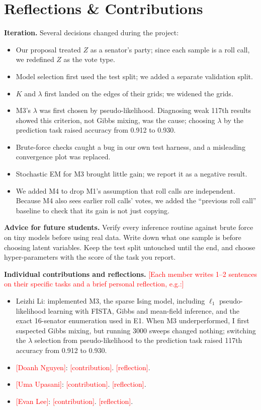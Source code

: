 \documentclass[10pt]{article}
\newcommand{\todo}[1]{\textcolor{red}{[#1]}}
\begin{document}
\section{Reflections \& Contributions}
\textbf{Iteration.} Several decisions changed during the project:
\begin{itemize}
\item Our proposal treated $Z$ as a senator's party; since each sample is a roll call, we redefined $Z$ as the vote type.
\item Model selection first used the test split; we added a separate validation split.
\item $K$ and $\lambda$ first landed on the edges of their grids; we widened the grids.
\item M3's $\lambda$ was first chosen by pseudo-likelihood. Diagnosing weak 117th results showed this criterion, not
Gibbs mixing, was the cause; choosing $\lambda$ by the prediction task raised accuracy from 0.912 to 0.930.
\item Brute-force checks caught a bug in our own test harness, and a misleading convergence plot was replaced.
\item Stochastic EM for M3 brought little gain; we report it as a negative result.
\item We added M4 to drop M1's assumption that roll calls are independent. Because M4 also sees earlier roll calls'
votes, we added the ``previous roll call'' baseline to check that its gain is not just copying.
\end{itemize}

\textbf{Advice for future students.} Verify every inference routine against brute force on tiny models before using
real data. Write down what one sample is before choosing latent variables. Keep the test split untouched until the
end, and choose hyper-parameters with the score of the task you report.

\textbf{Individual contributions and reflections.} \todo{Each member writes 1--2 sentences on their specific
tasks and a brief personal reflection, e.g.:}
\begin{itemize}
\item Leizhi Li: implemented M3, the sparse Ising model, including $\ell_1$ pseudo-likelihood learning with FISTA,
Gibbs and mean-field inference, and the exact 16-senator enumeration used in E1. When M3 underperformed, I
first suspected Gibbs mixing, but running 3000 sweeps changed nothing; switching the $\lambda$ selection from
pseudo-likelihood to the prediction task raised 117th accuracy from 0.912 to 0.930.
\item \todo{Doanh Nguyen}: \todo{contribution}. \todo{reflection}.
\item \todo{Uma Upasani}: \todo{contribution}. \todo{reflection}.
\item \todo{Evan Lee}: \todo{contribution}. \todo{reflection}.
\end{itemize}
\end{document}
